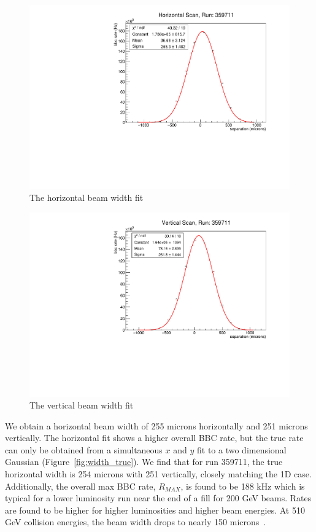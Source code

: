 \begin{figure}[ht]
  \centering
  \includegraphics[width=0.7\linewidth]{./figures/h_width_359711.pdf}
  \caption{
    The horizontal beam width fit
  }
  \label{fig:beam_width_h_359711}
\end{figure}
\begin{figure}[ht]
  \centering
  \includegraphics[width=0.7\linewidth]{./figures/v_width_359711.pdf}
  \caption{
    The vertical beam width fit
  }
  \label{fig:beam_width_v_359711}
\end{figure}
\clearpage

We obtain a horizontal beam width of 255 microns horizontally and 251 microns
vertically. The horizontal fit shows a higher overall BBC rate, but the true
rate can only be obtained from a simultaneous $x$ and $y$ fit to a two
dimensional Gaussian (Figure~\ref{fig:width_true}). We find that for run
359711, the true horizontal width is 254 microns with 251 vertically, closely
matching the 1D case. Additionally, the overall max BBC rate, $R_{MAX}$, is
found to be 188 kHz which is typical for a lower luminosity run near the end of
a fill for 200 GeV beams. Rates are found to be higher for higher luminosities
and higher beam energies. At 510 GeV collision energies, the beam
width drops to nearly 150 microns~\cite{Beaumier2015}.

